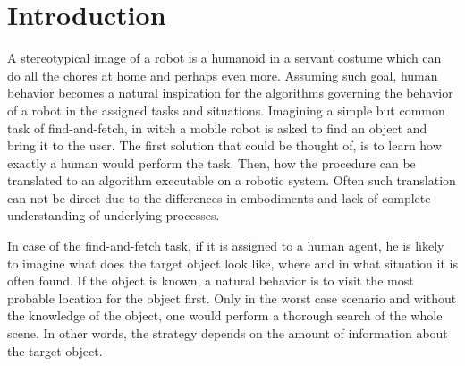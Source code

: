 \chapter{Introduction}
\label{Introduction.ch}
A stereotypical image of a robot is a humanoid in a servant costume which can do all the chores at home and perhaps even more. 
Assuming such goal, human behavior becomes a natural inspiration for the algorithms governing the behavior of a robot in the 
assigned tasks and situations.
Imagining a simple but common task of find-and-fetch, in witch a mobile robot is asked to find an object and bring it 
to the user. 
The first solution that could be thought of, is to learn how exactly a human would perform the task. 
Then, how the procedure can be translated to an algorithm executable on a robotic system.
Often such translation can not be direct due to the differences in embodiments and lack of complete understanding of 
underlying processes. 

In case of the find-and-fetch task, if it is assigned to a human agent, he is likely to imagine what does the target 
object look like, where and in what situation it is often found.
If the object is known, a natural behavior is to visit the most probable location for the object first.
Only in the worst case scenario and without the knowledge of the object, one would perform a thorough search of the 
whole scene.
In other words, the strategy depends on the amount of information about the target object. 

